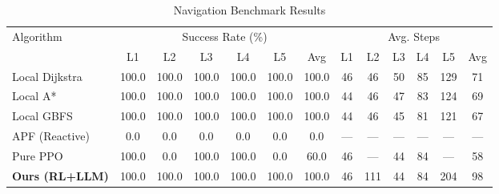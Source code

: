 \begin{table}[htbp]
\centering
\caption{Navigation Benchmark Results}
\label{tab:benchmark}
\begin{tabular}{lcccccccccccc}
\toprule
\multirow{2}{*}{Algorithm} & \multicolumn{6}{c}{Success Rate (\%)} & \multicolumn{6}{c}{Avg. Steps} \\
\cmidrule(lr){2-7} \cmidrule(lr){8-13}
 & L1 & L2 & L3 & L4 & L5 & Avg & L1 & L2 & L3 & L4 & L5 & Avg \\
\midrule
Local Dijkstra & 100.0 & 100.0 & 100.0 & 100.0 & 100.0 & 100.0 & 46 & 46 & 50 & 85 & 129 & 71 \\
Local A* & 100.0 & 100.0 & 100.0 & 100.0 & 100.0 & 100.0 & 44 & 46 & 47 & 83 & 124 & 69 \\
Local GBFS & 100.0 & 100.0 & 100.0 & 100.0 & 100.0 & 100.0 & 44 & 46 & 45 & 81 & 121 & 67 \\
APF (Reactive) & 0.0 & 0.0 & 0.0 & 0.0 & 0.0 & 0.0 & — & — & — & — & — & — \\
Pure PPO & 100.0 & 0.0 & 100.0 & 100.0 & 0.0 & 60.0 & 46 & — & 44 & 84 & — & 58 \\
\textbf{Ours (RL+LLM)} & 100.0 & 100.0 & 100.0 & 100.0 & 100.0 & 100.0 & 46 & 111 & 44 & 84 & 204 & 98 \\
\bottomrule
\end{tabular}
\end{table}